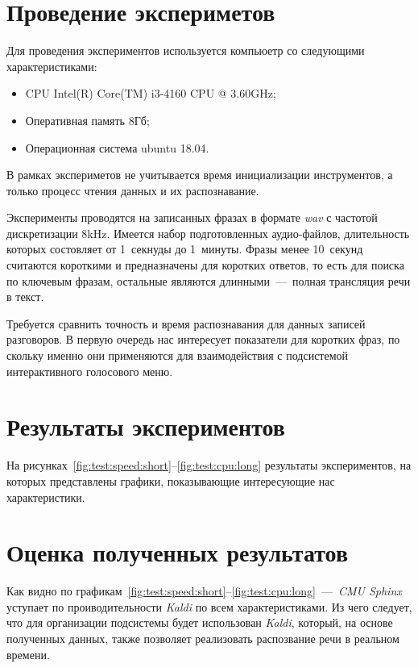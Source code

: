 


\section{Проведение экспериметов}
Для проведения экспериментов используется компьюетр со следующими характеристиками:
\begin{itemize}
    \item CPU Intel(R) Core(TM) i3-4160 CPU @ 3.60GHz;
    \item Оперативная память 8Гб;
    \item Операционная система ubuntu 18.04.
\end{itemize}

В рамках экспериметов не учитывается время инициализации инструментов, а только
процесс чтения данных и их распознавание.

Эксперименты проводятся на записанных фразах в формате \textit{wav} с частотой
дискретизации 8kHz. Имеется набор подготовленных аудио-файлов, длительность
которых состовляет от 1~секнуды до 1~минуты.
Фразы менее 10~секунд считаются короткими и предназначены для коротких ответов,
то есть для поиска по ключевым фразам, остальные являются длинными~---~полная
трансляция речи в текст.

Требуется сравнить точность и время распознавания для данных записей разговоров.
В первую очередь нас интересует показатели для коротких фраз, по скольку именно
они применяются для взаимодействия с подсистемой интерактивного голосового меню.

\section{Результаты экспериментов}
На рисунках~\ref{fig:test:speed:short}--\ref{fig:test:cpu:long} результаты
экспериментов, на которых представлены графики, показывающие интересующие нас
характеристики.


\section{Оценка полученных результатов}

Как видно по графикам~\ref{fig:test:speed:short}--\ref{fig:test:cpu:long}~---~\textit{CMU Sphinx}
уступает по проиводительности \textit{Kaldi} по всем характеристиками.
Из чего следует, что для организации подсистемы будет использован \textit{Kaldi},
который, на основе полученных данных, также позволяет реализовать распозвание речи
в реальном времени.
